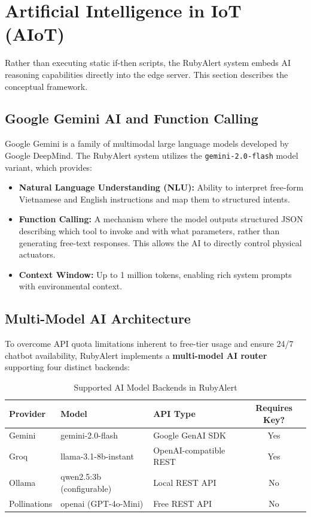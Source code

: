 \documentclass[12pt,a4paper]{report}
\begin{document}
\section{Artificial Intelligence in IoT (AIoT)}
\label{sec:aiot_foundation}

Rather than executing static if-then scripts, the RubyAlert system embeds AI reasoning capabilities directly into the edge server. This section describes the conceptual framework.

\subsection{Google Gemini AI and Function Calling}
Google Gemini \cite{gemini} is a family of multimodal large language models developed by Google DeepMind. The RubyAlert system utilizes the \texttt{gemini-2.0-flash} model variant, which provides:
\begin{itemize}
    \item \textbf{Natural Language Understanding (NLU):} Ability to interpret free-form Vietnamese and English instructions and map them to structured intents.
    \item \textbf{Function Calling:} A mechanism where the model outputs structured JSON describing which tool to invoke and with what parameters, rather than generating free-text responses. This allows the AI to directly control physical actuators.
    \item \textbf{Context Window:} Up to 1 million tokens, enabling rich system prompts with environmental context.
\end{itemize}

\subsection{Multi-Model AI Architecture}
To overcome API quota limitations inherent to free-tier usage and ensure 24/7 chatbot availability, RubyAlert implements a \textbf{multi-model AI router} supporting four distinct backends:

\begin{table}[H]
    \centering
    \begin{tabular}{|l|l|l|c|}
        \hline
        \textbf{Provider} & \textbf{Model} & \textbf{API Type} & \textbf{Requires Key?} \\ \hline
        Gemini & gemini-2.0-flash & Google GenAI SDK & Yes \\ \hline
        Groq & llama-3.1-8b-instant & OpenAI-compatible REST & Yes \\ \hline
        Ollama & qwen2.5:3b (configurable) & Local REST API & No \\ \hline
        Pollinations & openai (GPT-4o-Mini) & Free REST API & No \\ \hline
    \end{tabular}
    \caption{Supported AI Model Backends in RubyAlert}
    \label{tab:ai_models}
\end{table}
\end{document}
